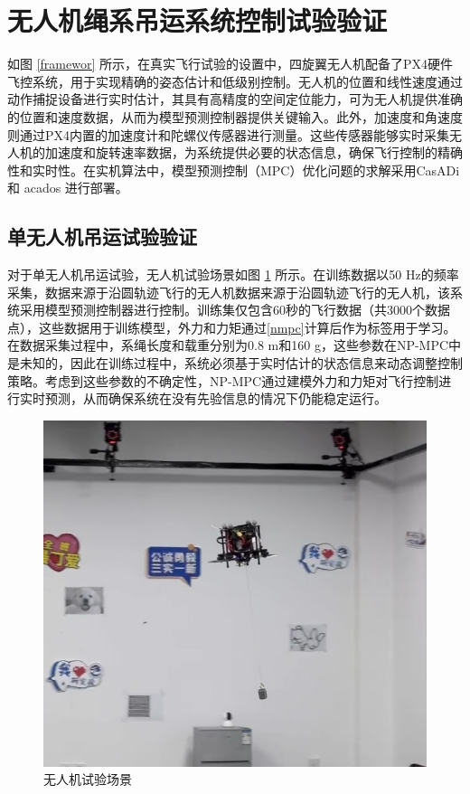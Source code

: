 \documentclass[lang=chs, degree=master, blindreview=true, winfonts=true]{yanputhesis}
\begin{document}
\section{无人机绳系吊运系统控制试验验证}
如图 \ref{framewor} 所示，在真实飞行试验的设置中，四旋翼无人机配备了PX4硬件飞控系统，用于实现精确的姿态估计和低级别控制。无人机的位置和线性速度通过动作捕捉设备进行实时估计，其具有高精度的空间定位能力，可为无人机提供准确的位置和速度数据，从而为模型预测控制器提供关键输入。此外，加速度和角速度则通过PX4内置的加速度计和陀螺仪传感器进行测量。这些传感器能够实时采集无人机的加速度和旋转速率数据，为系统提供必要的状态信息，确保飞行控制的精确性和实时性。在实机算法中，模型预测控制（MPC）优化问题的求解采用CasADi \cite{Andersson2019} 和 acados \cite{Verschueren2022} 进行部署。
\subsection{单无人机吊运试验验证}
对于单无人机吊运试验，无人机试验场景如图 \ref{dan} 所示。在训练数据以50 Hz的频率采集，数据来源于沿圆轨迹飞行的无人机数据来源于沿圆轨迹飞行的无人机，该系统采用模型预测控制器进行控制。训练集仅包含60秒的飞行数据（共3000个数据点），这些数据用于训练模型，外力和力矩通过\autoref{nmpc}计算后作为标签用于学习。在数据采集过程中，系绳长度和载重分别为0.8 m和160 g，这些参数在NP-MPC中是未知的，因此在训练过程中，系统必须基于实时估计的状态信息来动态调整控制策略。考虑到这些参数的不确定性，NP-MPC通过建模外力和力矩对飞行控制进行实时预测，从而确保系统在没有先验信息的情况下仍能稳定运行。
\begin{figure}[hbt!]
	\centering
	\includegraphics[width=28pc]{picture/danjireal.png} 
	\caption{无人机试验场景} 
	\label{dan}
\end{figure}
\end{document}
